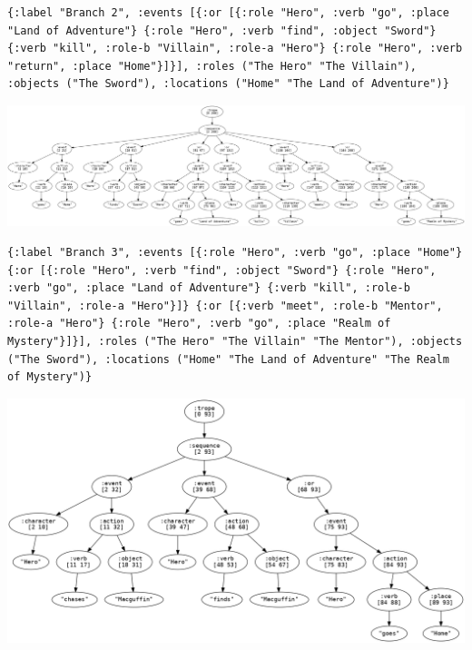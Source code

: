 \documentclass[11pt]{report}
\begin{document}
\begin{lstlisting}[showstringspaces=false]
{:label "Branch 2", :events [{:or [{:role "Hero", :verb "go", :place "Land of Adventure"} {:role "Hero", :verb "find", :object "Sword"} {:verb "kill", :role-b "Villain", :role-a "Hero"} {:role "Hero", :verb "return", :place "Home"}]}], :roles ("The Hero" "The Villain"), :objects ("The Sword"), :locations ("Home" "The Land of Adventure")}
\end{lstlisting}

\vspace{7mm}
\centerline{\includegraphics[width=\textwidth]{branch3-tree.png}}
\vspace{7mm}

\begin{lstlisting}[showstringspaces=false]
{:label "Branch 3", :events [{:role "Hero", :verb "go", :place "Home"} {:or [{:role "Hero", :verb "find", :object "Sword"} {:role "Hero", :verb "go", :place "Land of Adventure"} {:verb "kill", :role-b "Villain", :role-a "Hero"}]} {:or [{:verb "meet", :role-b "Mentor", :role-a "Hero"} {:role "Hero", :verb "go", :place "Realm of Mystery"}]}], :roles ("The Hero" "The Villain" "The Mentor"), :objects ("The Sword"), :locations ("Home" "The Land of Adventure" "The Realm of Mystery")}
\end{lstlisting}

\vspace{7mm}
\centerline{\includegraphics[width=\textwidth]{item-search-tree.png}}
\vspace{7mm}
\end{document}
